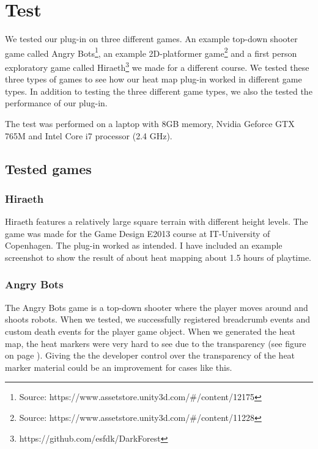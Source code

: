 \section{Test}
\label{Test}
We tested our plug-in on three different games. An example top-down shooter game called Angry Bots\footnote{Source: https://www.assetstore.unity3d.com/\#/content/12175}, an example 2D-platformer game\footnote{Source: https://www.assetstore.unity3d.com/\#/content/11228} and a first person exploratory game called Hiraeth\footnote{https://github.com/esfdk/DarkForest} we made for a different course. We tested these three types of games to see how our heat map plug-in worked in different game types. In addition to testing the three different game types, we also the tested the performance of our plug-in.

The test was performed on a laptop with 8GB memory, Nvidia Geforce GTX 765M and Intel Core i7 processor (2.4 GHz).

\subsection{Tested games}
\label{Test_TG}
\subsubsection{Hiraeth}
\label{Test_TG_H}


Hiraeth features a relatively large square terrain with different height levels. The game was made for the Game Design E2013 course at IT-University of Copenhagen. The plug-in worked as intended. I have included an example screenshot to show the result of about heat mapping about 1.5 hours of playtime.

\subsubsection{Angry Bots}
\label{Test_TG_AB}
The Angry Bots game is a top-down shooter where the player moves around and shoots robots. When we tested, we successfully registered breadcrumb events and custom death events for the player game object. When we generated the heat map, the heat markers were very hard to see due to the transparency (see figure  on page \pageref{fig:AB_01}). Giving the the developer control over the transparency of the heat marker material could be an improvement for cases like this.

